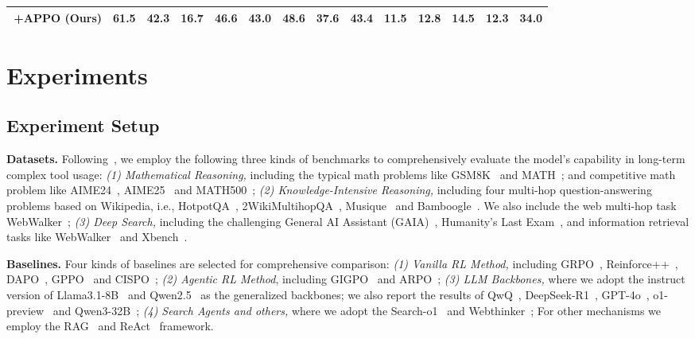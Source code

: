 \documentclass{article}
\begin{document}
\begin{table}[t]
{\begin{tabular}{lccccccccccccc}
\rowcolor{gray!20}
\,+\textbf{APPO (Ours)} & \textbf{61.5} & \textbf{42.3} & \textbf{16.7} & \textbf{46.6} & \textbf{43.0}  & \textbf{48.6} & \textbf{37.6} & \textbf{43.4} &\textbf{11.5} & \textbf{12.8} &\textbf{14.5}  &\textbf{12.3}  & \textbf{34.0}  \\ \bottomrule[1pt]
\end{tabular}}\vspace{-0.4cm}
\end{table}	 	 	 	 	 	 	 	 	 	 	 	 

\section{Experiments}
\subsection{Experiment Setup}
\noindent\textbf{Datasets.} Following~\cite{dong2025agentic1,dong2025agentic}, we employ  the following three kinds of benchmarks to comprehensively evaluate the model's capability in long-term complex tool usage: \textit{(1) Mathematical Reasoning,} including the typical math problems like GSM8K~\cite{cobbe2021training} and MATH~\cite{hendrycks2021measuring}; and competitive math problem like AIME24~\cite{aime24}, AIME25~\cite{aime25} and MATH500~\cite{lightman2023let}; \textit{(2) Knowledge-Intensive Reasoning,} including four multi-hop question-answering problems based on Wikipedia, i.e., HotpotQA~\cite{yang2018hotpotqa}, 2WikiMultihopQA~\cite{ho2020constructing}, Musique~\cite{trivedi2022musique} and Bamboogle~\cite{press2023measuring}. We also include the web multi-hop task WebWalker~\cite{wu2025webwalker}; \textit{(3) Deep Search,} including the challenging General AI Assistant (GAIA)~\cite{mialon2023gaia}, Humanity's Last Exam~\cite{phan2025humanity}, and information retrieval tasks like WebWalker~\cite{wu2025webwalker} and Xbench~\cite{chen2025xbench}.


\noindent\textbf{Baselines.} Four kinds of baselines are selected for comprehensive comparison: \textit{(1) Vanilla RL Method,} including GRPO~\cite{guo2025deepseek}, Reinforce++~\cite{hu2025reinforce++}, DAPO~\cite{yu2025dapo}, GPPO~\cite{su2025klear} and CISPO~\cite{chen2025minimax}; \textit{(2) Agentic RL Method}, including GIGPO~\cite{feng2025group} and ARPO~\cite{dong2025agentic}; \textit{(3) LLM Backbones,} where we adopt the instruct version of Llama3.1-8B~\cite{dubey2024llama} and Qwen2.5~\cite{hui2024qwen2} as the generalized backbones; we also report the results of QwQ~\cite{team2024qwq}, DeepSeek-R1~\cite{guo2025deepseek}, GPT-4o~\cite{hurst2024gpt}, o1-preview~\cite{hurst2024gpt} and Qwen3-32B~\cite{yang2025qwen3}; \textit{(4) Search Agents and others,} where we adopt the Search-o1~\cite{li2025search} and Webthinker~\cite{li2025webthinker}; For other mechanisms we employ the RAG~\cite{lewis2020retrieval} and ReAct~\cite{yao2022react} framework.
\end{document}
